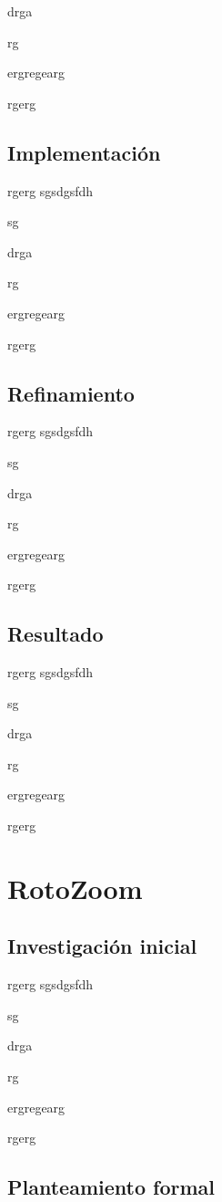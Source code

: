 drga

rg

ergregearg

rgerg

\subsection{Implementación}

rgerg
sgsdgsfdh

sg

drga

rg

ergregearg

rgerg

\subsection{Refinamiento}

rgerg
sgsdgsfdh

sg

drga

rg

ergregearg

rgerg

\subsection{Resultado}

rgerg
sgsdgsfdh

sg

drga

rg

ergregearg

rgerg


\section{RotoZoom}

\subsection{Investigación inicial}

rgerg
sgsdgsfdh

sg

drga

rg

ergregearg

rgerg

\subsection{Planteamiento formal}

